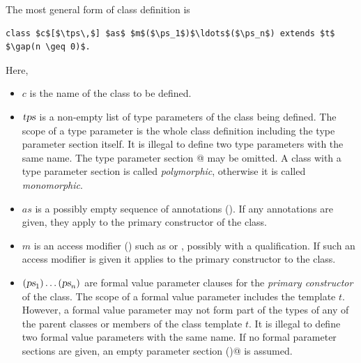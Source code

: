 The most general form of class definition is 
\begin{lstlisting}
class $c$[$\tps\,$] $as$ $m$($\ps_1$)$\ldots$($\ps_n$) extends $t$    $\gap(n \geq 0)$.
\end{lstlisting}
Here,
\begin{itemize}
\item[]
$c$ is the name of the class to be defined.
\item[] $\mbox{\sl tps}$ is a non-empty list of type parameters of the class
being defined.  The scope of a type parameter is the whole class
definition including the type parameter section itself.  It is
illegal to define two type parameters with the same name.  The type
parameter section \lstinline@[$\tps\,$]@ may be omitted. A class with a type
parameter section is called {\em polymorphic}, otherwise it is called
{\em monomorphic}.
\item[] $as$ is a possibly empty sequence of annotations
  (). If any annotations are given, 
they apply to the primary constructor of the class.
\item[] $m$ is an access modifier () such as
 or , possibly with a qualification.  If
such an access modifier is given it applies to the primary constructor
to the class.
\item[] 
$(\mbox{\sl ps}_1)\ldots(\mbox{\sl ps}_n)$ are formal value parameter clauses for the {\em primary
constructor} of the class. The scope of a formal value parameter includes
the template $t$. However, a formal value parameter may not form 
part of the types of any of the parent classes or members of the class
template $t$.
It is illegal to define two formal value parameters with the same name.
If no formal parameter sections are given, 
an empty parameter section \lstinline@()@ is assumed.


\end{itemize}

